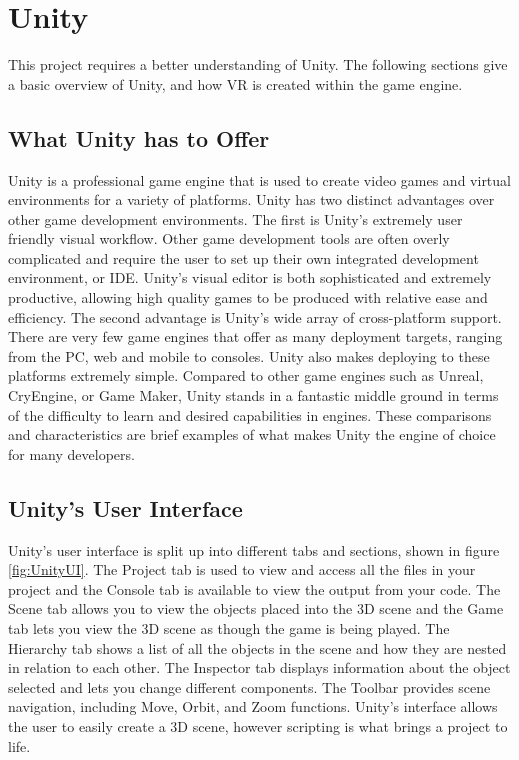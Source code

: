 \documentclass[12pt]{article}
\begin{document}
\section{Unity}

This project requires a better understanding of Unity. The following sections give a basic overview of Unity, and how VR is created within the game engine. 

\subsection{What Unity has to Offer}

Unity is a professional game engine that is used to create video games and virtual environments for a variety of platforms. Unity has two distinct advantages over other game development environments. The first is Unity's extremely user friendly visual workflow. Other game development tools are often overly complicated and require the user to set up their own integrated development environment, or IDE. Unity's visual editor is both sophisticated and extremely productive, allowing high quality games to be produced with relative ease and efficiency. The second advantage is Unity's wide array of cross-platform support. There are very few game engines that offer as many deployment targets, ranging from the PC, web and mobile to consoles. Unity also makes deploying to these platforms extremely simple. Compared to other game engines such as Unreal, CryEngine, or Game Maker, Unity stands in a fantastic middle ground in terms of the difficulty to learn and desired capabilities in engines. These comparisons and characteristics are brief examples of what makes Unity the engine of choice for many developers.

\subsection{Unity's User Interface}

Unity's user interface is split up into different tabs and sections, shown in figure \ref{fig:UnityUI}. The Project tab is used to view and access all the files in your project and the Console tab is available to view the output from your code. The Scene tab allows you to view the objects placed into the 3D scene and the Game tab lets you view the 3D scene as though the game is being played. The Hierarchy tab shows a list of all the objects in the scene and how they are nested in relation to each other. The Inspector tab displays information about the object selected and lets you change different components. The Toolbar provides scene navigation, including Move, Orbit, and Zoom functions. Unity's interface allows the user to easily create a 3D scene, however scripting is what brings a project to life. 
\end{document}
